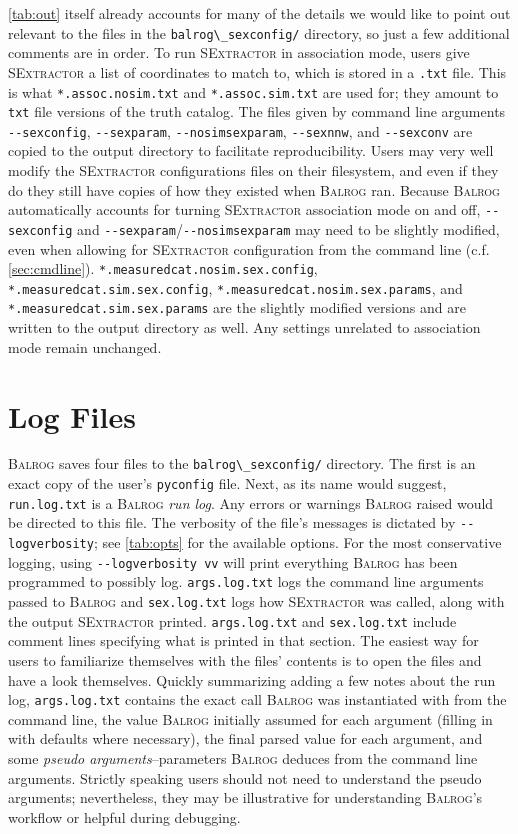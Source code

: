\documentclass[12pt]{book}
\newcommand{\codett}[1]{\lstinline{#1}}
\newcommand{\pyconfig}{\codett{pyconfig}}
\newcommand{\balrog}{\textsc{Balrog}}
\newcommand{\sex}{\textsc{SExtractor}}
\newcommand{\opt}[1]{\codett{--#1}}
\begin{document}
\autoref{tab:out} itself already accounts for many of the details 
we would like to point out relevant to
the files in the \codett{balrog\_sexconfig/} directory, so just a few
additional comments are in order.
To run \sex{} in association mode, users give \sex{} a list of coordinates to match to,
which is stored in a \codett{.txt} file.
This is what \codett{*.assoc.nosim.txt} and \codett{*.assoc.sim.txt} are used for;
they amount to \codett{txt} file versions of the truth catalog.
The files given by command line arguments \opt{sexconfig}, \opt{sexparam}, \opt{nosimsexparam}, \opt{sexnnw}, and \opt{sexconv}
are copied to the output directory to facilitate reproducibility. Users may very well modify 
the \sex{} configurations files on their filesystem, and even if they do they still have
copies of how they existed when \balrog{} ran.
Because \balrog{} automatically accounts for turning \sex{} association mode on and off, 
\opt{sexconfig} and \opt{sexparam}/\opt{nosimsexparam} may need to be slightly modified, even when allowing for
\sex{} configuration from the command line (c.f. \autoref{sec:cmdline}).
\codett{*.measuredcat.nosim.sex.config}, \codett{*.measuredcat.sim.sex.config}, \codett{*.measuredcat.nosim.sex.params}, 
and \codett{*.measuredcat.sim.sex.params} 
are the slightly modified versions and are written to the output directory as well.
Any settings unrelated to association mode remain unchanged.


\section{Log Files}
\label{sec:logs}

\balrog{} saves four files to the \codett{balrog\_sexconfig/} directory.
The first is an exact copy of the user's \pyconfig{} file.
Next, as its name would suggest, \codett{run.log.txt} is a \balrog{} \emph{run log}.
Any errors or warnings \balrog{} raised would be directed to this file.
The verbosity of the file's messages is dictated by \opt{logverbosity}; see \autoref{tab:opts}
for the available options. For the most conservative logging, 
using \opt{logverbosity vv} will print everything \balrog{} has been programmed 
to possibly log.
\codett{args.log.txt} logs the command line arguments passed to \balrog{}
and \codett{sex.log.txt} logs how \sex{} was called, along with the output \sex{} printed.
\codett{args.log.txt} and \codett{sex.log.txt} include comment lines specifying 
what is printed in that section.
The easiest way for users to familiarize themselves with the files' contents is to
open the files and have a look themselves.
Quickly summarizing adding a few notes about the run log, \codett{args.log.txt} contains the exact call \balrog{} was
instantiated with from the command line, the value \balrog{} initially assumed
for each argument (filling in with defaults where necessary), the final parsed value
for each argument, and some \emph{pseudo arguments}--parameters \balrog{} deduces from
the command line arguments. Strictly speaking users should not need to understand the 
pseudo arguments; nevertheless, they may be illustrative
for understanding \balrog{}'s workflow or helpful during debugging.
\end{document}
